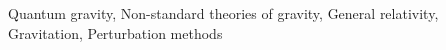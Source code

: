 \documentclass[twocolumn]{aastex631}
\begin{document}
Quantum gravity, Non-standard theories of gravity, General relativity, Gravitation, Perturbation methods
\end{document}
